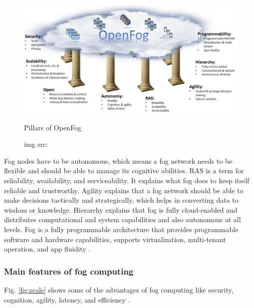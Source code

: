 \begin{figure}[H]
    \centering
    \includegraphics[width=\textwidth]{image/Pillars of OpenFog.png}
    \caption{Pillars of OpenFog}
    \caption*{img src: \cite{openfog2016openfog}}
    \label{fig:pillars of openfog}
\end{figure}

Fog nodes have to be autonomous, which means a fog network needs to be flexible and should be able to manage its cognitive abilities. 
RAS is a term for reliability, availability, and serviceability. It explains what fog does to keep itself reliable and trustworthy. 
Agility explains that a fog network should be able to make decisions tactically and strategically, which helps in converting data to wisdom or knowledge. 
Hierarchy explains that fog is fully cloud-enabled and distributes computational and system capabilities and also autonomous at all levels. 
Fog is a fully programmable architecture that provides programmable software and hardware capabilities, supports virtualization, multi-tenant operation, and app fluidity \cite{youtube}.


\subsubsection{Main features of fog computing}

Fig. \ref{fig:scale} shows some of the advantages of fog computing like security, cognition, agility, latency, and efficiency \cite{openfog2016openfog}.

